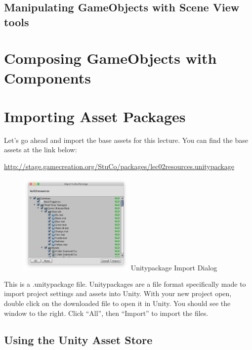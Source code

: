 \documentclass[11pt]{article}
\begin{document}
\subsection{Manipulating GameObjects with Scene View tools}

\section{Composing GameObjects with Components}

\section{Importing Asset Packages}

Let's go ahead and import the base assets for this lecture.  You can find the base assets at the link below:
\begin{center}
\href{http://stage.gamecreation.org/StuCo/packages/lec02resources.unitypackage}{http://stage.gamecreation.org/StuCo/packages/lec02resources.unitypackage}
\end{center}

\begin{figure}
    \centering
    \includegraphics[width=0.5\textwidth]{import-diag}
    Unitypackage Import Dialog
\end{figure}

This is a .unitypackage file.  Unitypackages are a file format specifically made to import project settings and assets into Unity.  With your new project open, double click on the downloaded file to open it in Unity.  You should see the window to the right.  Click ``All'', then ``Import'' to import the files.

\subsection{Using the Unity Asset Store}
\end{document}
